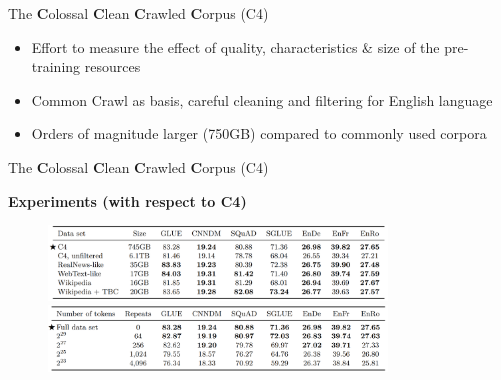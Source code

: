 
\begin{frame}{The \textbf{C}olossal \textbf{C}lean \textbf{C}rawled \textbf{C}orpus (C4)}

\vfill

	\begin{itemize}
		\item Effort to measure the effect of quality, characteristics \& size of the pre-training resources
		\item Common Crawl as basis, careful cleaning and filtering for English language
		\item Orders of magnitude larger (750GB) compared to commonly used corpora 
	\end{itemize}
	
\vfill

\end{frame}


\begin{frame}{The \textbf{C}olossal \textbf{C}lean \textbf{C}rawled \textbf{C}orpus (C4)}

\vfill
	
	\textbf{Experiments (with respect to C4)}
	
	\begin{figure}
		\centering
		\includegraphics[width = 9cm]{figure/63-c4-characteristics.png}\\ 
		\includegraphics[width = 9cm]{figure/63-c4-size.png}\\ 
	\end{figure}
	
\vfill

\end{frame}



